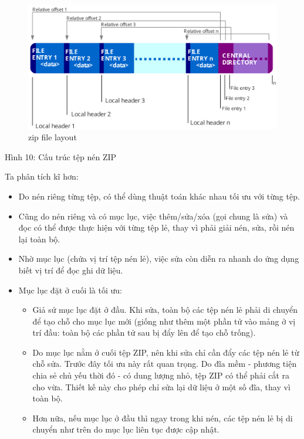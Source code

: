 \documentclass[
]{article}
\providecommand{\tightlist}{%
  \setlength{\itemsep}{0pt}\setlength{\parskip}{0pt}}
\begin{document}
\begin{figure}
\centering
\includegraphics{../images/ZIP-64_Internal_Layout.svg}
\caption{zip file layout}
\end{figure}

Hình 10: Cấu trúc tệp nén ZIP

Ta phân tích kĩ hơn:

\begin{itemize}
\item
  Do nén riêng từng tệp, có thể dùng thuật toán khác nhau tối ưu với
  từng tệp.
\item
  Cũng do nén riêng và có mục lục, việc thêm/sửa/xóa (gọi chung là sửa)
  và đọc có thể được thực hiện với từng tệp lẻ, thay vì phải giải nén,
  sửa, rồi nén lại toàn bộ.
\item
  Nhờ mục lục (chứa vị trí tệp nén lẻ), việc sửa còn diễn ra nhanh do
  ứng dụng biết vị trí để đọc ghi dữ liệu.
\item
  Mục lục đặt ở cuối là tối ưu:

  \begin{itemize}
  \tightlist
  \item
    Giả sử mục lục đặt ở đầu. Khi sửa, toàn bộ các tệp nén lẻ phải di
    chuyển để tạo chỗ cho mục lục mới (giống như thêm một phần tử vào
    mảng ở vị trí đầu: toàn bộ các phần tử sau bị đẩy lên để tạo chỗ
    trống).
  \item
    Do mục lục nằm ở cuối tệp ZIP, nên khi sửa chỉ cần đẩy các tệp nén
    lẻ từ chỗ sửa. Trước đây tối ưu này rất quan trọng. Do đĩa mềm -
    phương tiện chia sẻ chủ yếu thời đó - có dung lượng nhỏ, tệp ZIP có
    thể phải cắt ra cho vừa. Thiết kế này cho phép chỉ sửa lại dữ liệu ở
    một số đĩa, thay vì toàn bộ.
  \item
    Hơn nữa, nếu mục lục ở đầu thì ngay trong khi nén, các tệp nén lẻ bị
    di chuyển như trên do mục lục liên tục được cập nhật.
  \end{itemize}
\end{itemize}
\end{document}
